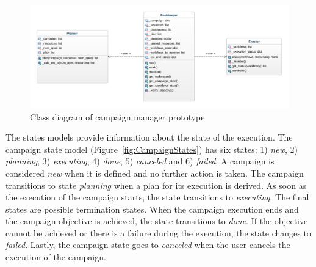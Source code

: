 \begin{figure}[t]
    \centering
    \includegraphics[width=.95\textwidth]{figures/manager/class_diagram.png}
    \caption{Class diagram of campaign manager prototype}\label{fig:rcm_class_diagram}
\end{figure}

The states models provide information about the state of the execution.
The campaign state model (Figure~\ref{fig:CampaignStates}) has six states: 1) \textit{new}, 2) \textit{planning}, 3) \textit{executing}, 4) \textit{done}, 5) \textit{canceled} and 6) \textit{failed}.
A campaign is considered \textit{new} when it is defined and no further action is taken.
The campaign transitions to state \textit{planning} when a plan for its execution is derived.
As soon as the execution of the campaign starts, the state transitions to \textit{executing}.
The final states are possible termination states.
When the campaign execution ends and the campaign objective is achieved, the state transitions to \textit{done}.
If the objective cannot be achieved or there is a failure during the execution, the state changes to \textit{failed}.
Lastly, the campaign state goes to \textit{canceled} when the user cancels the execution of the campaign.

